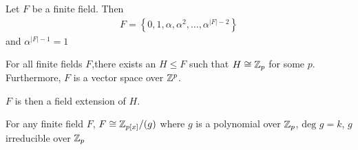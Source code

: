 \documentclass{memoir}
\begin{document}
\begin{thm}
	Let \(F\) be a finite field. Then
	\begin{align*}
		F = \left\{ 0,1,\alpha,\alpha^2,\ldots,\alpha ^{\left| F \right| -2}\right\} 
	\end{align*}
	and \(\alpha ^{\left| F \right| -1} = 1\)
\end{thm}
\begin{thm}
	For all finite fields \(F\),there exists an \(H\leq F\) such that \(H \cong \mathbb{Z}_p\) for some \(p\). Furthermore, \(F\) is a vector space over \(\mathbb{Z}^{p}\).
\end{thm}
\(F\) is then a field extension of \(H\).
\begin{thm}
	For any finite field \(F\), \(F \cong \mathbb{Z}_{p[x]} / (g)\) where \(g\) is a polynomial over \(\mathbb{Z}_p\), \( \textrm{deg }g = k\), \(g\) irreducible over \(\mathbb{Z}_p\)
\end{thm}
\end{document}
